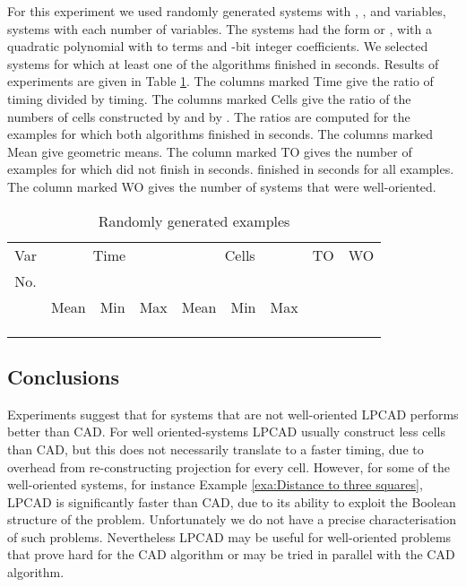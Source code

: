 \documentclass[english]{amsart}
\providecommand{\tabularnewline}{\\}
\numberwithin{equation}{section}
\numberwithin{figure}{section}
\begin{document}
For this experiment we used randomly generated systems with ,
, and  variables,  systems with each number of variables.
The systems had the form  or , with a quadratic polynomial
 with  to  terms and -bit integer coefficients.
We selected systems for which at least one of the algorithms finished
in  seconds. Results of experiments are given in Table \ref{tab:Random}.
The columns marked Time give the ratio of  timing divided by
 timing. The columns marked Cells give the ratio of the numbers
of cells constructed by  and by . The ratios are computed
for the examples for which both algorithms finished in  seconds.
The columns marked Mean give geometric means. The column marked TO
gives the number of examples for which  did not finish in 
seconds.  finished in  seconds for all examples. The
column marked WO gives the number of systems that were well-oriented.

\begin{table}
\caption{\label{tab:Random}Randomly generated examples}
\begin{tabular}{|c|c|c|c|c|c|c|c|c|}
\hline 
Var & \multicolumn{3}{c|}{Time} & \multicolumn{3}{c|}{Cells} & \multicolumn{1}{c|}{TO} & WO\tabularnewline
No. & \multicolumn{3}{c|}{} & \multicolumn{3}{c|}{} &  & \tabularnewline
\cline{2-7} 
 & Mean & \multicolumn{1}{c|}{Min} & \multicolumn{1}{c|}{Max} & Mean & Min & Max &  & \tabularnewline
\hline 
 &  &  &  &  &  &  &  & \tabularnewline
\hline 
 &  &  &  &  &  &  &  & \tabularnewline
\hline 
 &  &  &  &  &  &  &  & \tabularnewline
\hline
\end{tabular} 
\end{table}



\subsection{Conclusions}

Experiments suggest that for systems that are not well-oriented LPCAD
performs better than CAD. For well oriented-systems LPCAD usually
construct less cells than CAD, but this does not necessarily translate
to a faster timing, due to overhead from re-constructing projection
for every cell. However, for some of the well-oriented systems, for
instance Example \ref{exa:Distance to three squares}, LPCAD is significantly
faster than CAD, due to its ability to exploit the Boolean structure
of the problem. Unfortunately we do not have a precise characterisation
of such problems. Nevertheless LPCAD may be useful for well-oriented
problems that prove hard for the CAD algorithm or may be tried in
parallel with the CAD algorithm.
\end{document}
